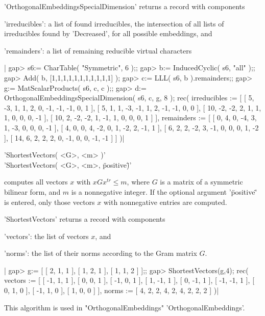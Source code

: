 'OrthogonalEmbeddingsSpecialDimension' returns a record with components

'irreducibles':  a list of found irreducibles, the intersection of all
                 lists of irreducibles found by 'Decreased', for all
                 possible embeddings, and

'remainders':    a list of remaining reducible virtual characters


|    gap> s6:= CharTable( "Symmetric", 6 );;
    gap> b:= InducedCyclic( s6, "all" );;
    gap> Add( b, [1,1,1,1,1,1,1,1,1,1,1] );
    gap> c:= LLL( s6, b ).remainders;;
    gap> g:= MatScalarProducts( s6, c, c );;
    gap> d:= OrthogonalEmbeddingsSpecialDimension( s6, c, g, 8 );
    rec(
      irreducibles :=
       [ [ 5, -3, 1, 1, 2, 0, -1, -1, -1, 0, 1 ], [ 5, 1, 1, -3, -1, 1,
              2, -1, -1, 0, 0 ], [ 10, -2, -2, 2, 1, 1, 1, 0, 0, 0, -1 ],
          [ 10, 2, -2, -2, 1, -1, 1, 0, 0, 0, 1 ] ],
      remainders :=
       [ [ 0, 4, 0, -4, 3, 1, -3, 0, 0, 0, -1 ], [ 4, 0, 0, 4, -2, 0, 1,
              -2, 2, -1, 1 ], [ 6, 2, 2, -2, 3, -1, 0, 0, 0, 1, -2 ],
          [ 14, 6, 2, 2, 2, 0, -1, 0, 0, -1, -1 ] ] )|


'ShortestVectors( <G>, <m> )'\\
'ShortestVectors( <G>, <m>, \"positive\" )'

computes all vectors $x$ with $x G x^{tr} \leq m$,  where $G$ is a matrix
of a symmetric bilinear  form, and $m$  is a nonnegative integer.  If the
optional argument '\"positive\"' is entered, only  those vectors $x$ with
nonnegative entries are computed.

'ShortestVectors' returns a record with components

'vectors':  the list of vectors $x$, and

'norms':    the list of their norms according to the Gram matrix $G$.

|    gap> g:= [ [ 2, 1, 1 ], [ 1, 2, 1 ], [ 1, 1, 2 ] ];;
    gap> ShortestVectors(g,4);
    rec(
      vectors := [ [ -1, 1, 1 ], [ 0, 0, 1 ], [ -1, 0, 1 ], [ 1, -1, 1 ],
          [ 0, -1, 1 ], [ -1, -1, 1 ], [ 0, 1, 0 ], [ -1, 1, 0 ],
          [ 1, 0, 0 ] ],
      norms := [ 4, 2, 2, 4, 2, 4, 2, 2, 2 ] )|

This algorithm is used in "OrthogonalEmbeddings" 'OrthogonalEmbeddings'.


